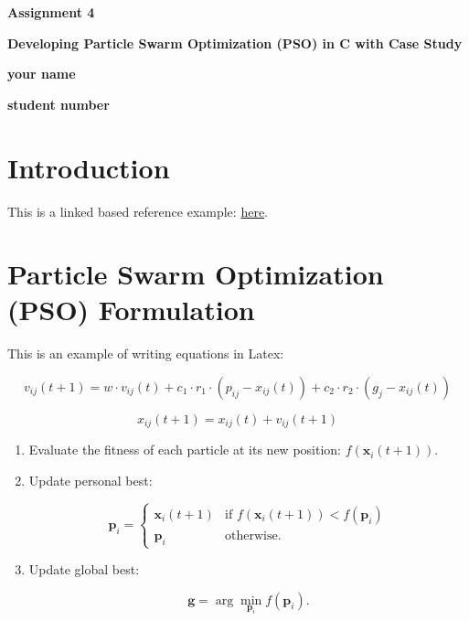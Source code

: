 \documentclass[12pt]{article}
\begin{document}
	
	\justifying
	
	\begin{center}
		\textbf{{\large Assignment 4}}
		
		\textbf{Developing Particle Swarm Optimization (PSO) in C with Case Study} 
		
		\textbf{your name}
		
		\textbf{student number}
	\end{center}
	

	
	
	
	\section{Introduction}
	
	
	
	This is a linked based reference example: \href{https://www.sfu.ca/~ssurjano/optimization.html}{here}.
	
	
	
	
	
	

	
	
	\section{Particle Swarm Optimization (PSO) Formulation}
	
	
	This is an example of writing equations in Latex:
	
	\[
	v_{ij}(t+1) = w \cdot v_{ij}(t) + c_1 \cdot r_1 \cdot (p_{ij} - x_{ij}(t)) + c_2 \cdot r_2 \cdot (g_j - x_{ij}(t))
	\]
	
	
	\[
	x_{ij}(t+1) = x_{ij}(t) + v_{ij}(t+1)
	\]
	
	
	\begin{enumerate}
		\item Evaluate the fitness of each particle at its new position: \(f(\mathbf{x}_i(t+1))\).
		
		\item  Update personal best:
		
		\[
		\mathbf{p}_i = 
		\begin{cases} 
			\mathbf{x}_i(t+1) & \text{if } f(\mathbf{x}_i(t+1)) < f(\mathbf{p}_i) \\
			\mathbf{p}_i & \text{otherwise.}
		\end{cases}
		\]
		
		\item  Update global best:
		
		\[
		\mathbf{g} = \arg\min_{\mathbf{p}_i} f(\mathbf{p}_i).
		\]
	\end{enumerate}
	
\end{document}
